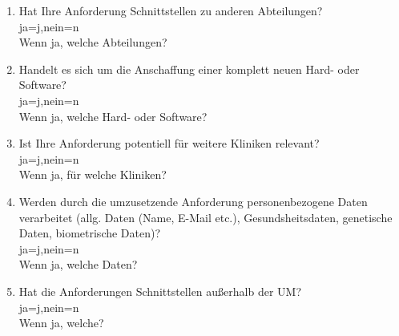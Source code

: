 \begin{Form}
\begin{enumerate}
	\item Hat Ihre Anforderung Schnittstellen zu anderen Abteilungen? \\ 
	\ChoiceMenu[radio, radiosymbol=6 default=n, width=0.5cm, name=consedep]{} {ja=j,nein=n} \\
	Wenn ja, welche Abteilungen? \\
	\TextField[multiline, name=jconsedep,width=0.9\textwidth,  height=2cm, value={}]{}
	
	\item Handelt es sich um die Anschaffung einer komplett neuen Hard- oder Software? \\ 
	\ChoiceMenu[radio, radiosymbol=6 default=n, width=0.5cm, name=soha]{} {ja=j,nein=n} \\
	Wenn ja, welche Hard- oder Software? \\
	\TextField[multiline, name=jsoja,width=0.9\textwidth,  height=2cm, value={}]{}
	
	\item Ist Ihre Anforderung potentiell für weitere Kliniken relevant?
	 \\ \ChoiceMenu[radio, radiosymbol=6 default=n, width=0.5cm, name=user]{} {ja=j,nein=n} \\
	Wenn ja, für welche Kliniken? \\
	\TextField[multiline, name=juser,width=0.9\textwidth,  height=2cm, value={}]{}

	\newpage

	\item Werden durch die umzusetzende Anforderung personenbezogene Daten verarbeitet (allg. Daten (Name, E-Mail etc.), Gesundsheitsdaten, genetische Daten, biometrische Daten)? \\ 
	\ChoiceMenu[radio, radiosymbol=6 default=n, width=0.5cm, name=persodata]{} {ja=j,nein=n} \\
	Wenn ja, welche Daten? \\
	\TextField[multiline, name=jpersodata,width=0.9\textwidth,  height=2cm, value={}]{}
	
	\item Hat die Anforderungen Schnittstellen außerhalb der UM? \\ 
	\ChoiceMenu[radio, radiosymbol=6 default=n, width=0.5cm, name=outum]{} {ja=j,nein=n} \\
	Wenn ja, welche? \\
	\TextField[multiline, name=joutum,width=0.9\textwidth,  height=2cm, value={}]{}

  \end{enumerate}
\end{Form}